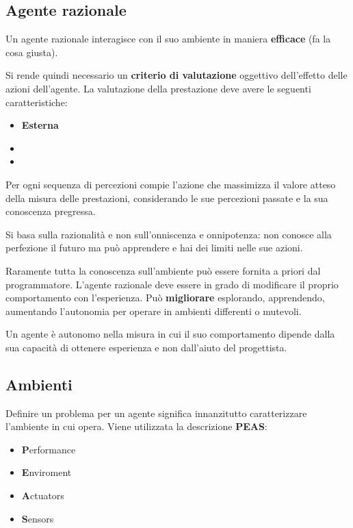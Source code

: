 \subsection{Agente razionale}
\begin{definition}
	Un agente razionale interagisce con il suo ambiente in maniera \textbf{efficace} (fa la cosa giusta).
\end{definition}
Si rende quindi necessario un \textbf{criterio di valutazione} oggettivo dell'effetto delle azioni dell'agente. La valutazione della prestazione deve avere le seguenti caratteristiche:
\begin{itemize}
	\item \textbf{Esterna}
	\item 
	\item 
\end{itemize}
\begin{definition}
	Per ogni sequenza di percezioni compie l’azione che massimizza il valore atteso della
	misura delle prestazioni, considerando le sue percezioni passate e la sua conoscenza pregressa.
\end{definition}
\begin{observation}
	Si basa sulla razionalità e non sull'onniscenza e onnipotenza: non conosce alla perfezione il futuro ma può apprendere e hai dei limiti nelle sue azioni.
\end{observation}

Raramente tutta la conoscenza sull’ambiente può essere fornita a priori dal programmatore. L’agente razionale deve essere in grado di modificare il proprio comportamento con l’esperienza. Può \textbf{migliorare} esplorando, apprendendo, aumentando l'autonomia per operare in ambienti differenti o mutevoli.

\begin{definition}
	Un agente è autonomo nella misura in cui il suo comportamento dipende dalla sua
	capacità di ottenere esperienza e non dall’aiuto del progettista.
\end{definition}

\subsection{Ambienti}
Definire un problema per un agente significa innanzitutto caratterizzare l'ambiente in cui opera. Viene utilizzata la descrizione \textbf{PEAS}:
\begin{itemize}
	\item \textbf{P}erformance
	\item \textbf{E}nviroment
	\item \textbf{A}ctuators
	\item \textbf{S}ensors
\end{itemize}

